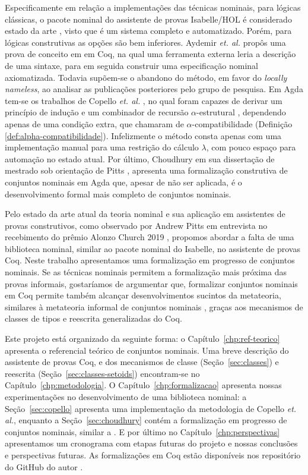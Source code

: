 Especificamente em relação a implementações das técnicas nominais, para lógicas clássicas, o pacote nominal \cite{IsabelleNominal, Urban2008} do assistente de provas Isabelle/HOL \cite{Nipkow2002} é considerado estado da arte \cite{Pitts2016}, visto que é um sistema completo e automatizado. Porém, para lógicas construtivas as opções são bem inferiores. Aydemir \textit{et. al.} propôs uma prova de conceito em \cite{Aydemir2007} em Coq, na qual uma ferramenta externa leria a descrição de uma sintaxe, para em seguida construir uma especificação nominal axiomatizada. Todavia supõem-se o abandono do método, em favor do \textit{locally nameless}, ao analisar as publicações posteriores pelo grupo de pesquisa. Em Agda tem-se os trabalhos de Copello \textit{et. al.} \cite{Copello2016,Copello2018} , no qual foram capazes de derivar um princípio de indução e um combinador de recursão $\alpha$-estrutural \cite{Pitts2006}, dependendo apenas de uma condição extra, que chamaram de $\alpha$-compatibilidade (Definição \ref{def:alpha-compatibilidade}). Infelizmente o método consta apenas com uma implementação manual para uma restrição do cálculo $\lambda$, com pouco espaço para automação no estado atual. Por último, Choudhury em sua dissertação de mestrado sob orientação de Pitts \cite{Choudhury2015}, apresenta uma formalização construtiva de conjuntos nominais em Agda que, apesar de não ser aplicada, é o desenvolvimento formal mais completo de conjuntos nominais.

Pelo estado da arte atual da teoria nominal e sua aplicação em assistentes de provas construtivos, como observado por Andrew Pitts em entrevista no recebimento do prêmio Alonzo Church 2019 \cite{Aceto2019}, propomos abordar a falta de uma biblioteca nominal, similar ao pacote nominal do Isabelle, no assistente de provas Coq. Neste trabalho apresentamos uma formalização em progresso de conjuntos nominais. Se as técnicas nominais permitem a formalização mais próxima das provas informais, gostaríamos de argumentar que, formalizar conjuntos nominais em Coq permite também alcançar desenvolvimentos sucintos da metateoria, similares à metateoria informal de conjuntos nominais \cite{Pitts2013}, graças aos mecanismos de classes de tipos e reescrita generalizadas do Coq.

Este projeto está organizado da seguinte forma: o Capítulo~\ref{chp:ref-teorico} apresenta o referencial teórico de conjuntos nominais. Uma breve descrição do assistente de provas Coq, e dos mecanismos de classe (Seção~\ref{sec:classes}) e reescrita (Seção~\ref{sec:classes-setoids}) encontram-se no Capítulo~\ref{chp:metodologia}. O Capítulo~\ref{chp:formalizacao} apresenta nossas experimentações no desenvolvimento de uma biblioteca nominal: a Seção~\ref{sec:copello}
apresenta uma implementação da metodologia de Copello \textit{et. al.}, enquanto a Seção~\ref{sec:choudhury} contém a formalização em progresso de conjuntos nominais, similar a \cite{Choudhury2015}. E por último no Capítulo~\ref{chp:perspectivas}  apresentamos um cronograma com etapas futuras do projeto e nossas conclusões e perspectivas futuras. As formalizações em Coq estão disponíveis nos repositório do GitHub do autor \cite{FChoud,FCopello}.
